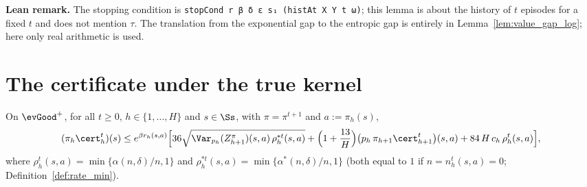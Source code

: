 \textbf{Lean remark.} The stopping condition is \texttt{stopCond r β δ ε s₁ (histAt X Y t ω)};
this lemma is about the history of $t$ episodes for a fixed $t$ and does not mention $\tau$. The
translation from the exponential gap to the entropic gap is entirely in
Lemma~\ref{lem:value_gap_log}; here only real arithmetic is used.

\section{The certificate under the true kernel}
\label{sec:pos_true_kernel}

\begin{lemma}\label{lem:cert_true_recursion_pos}
\leanok
{}
On $\evGood^+$, for all $t \ge 0$, $h \in \{1, \dots, H\}$ and $s \in \Ss$, with $\pi = \pi^{t+1}$ and
$a := \pi_h(s)$,
\[
  (\pi_h\cert_h^t)(s) \le e^{\beta r_h(s,a)}\Big[
    36\sqrt{\Var_{p_h}(Z^\pi_{h+1})(s,a)\,\rho^{*t}_h(s,a)}
    + \Big(1 + \frac{13}{H}\Big)\big(p_h\,\pi_{h+1}\cert^t_{h+1}\big)(s,a)
    + 84\,H\,c_h\,\rho^t_h(s,a)\Big] ,
\]
where $\rho^t_h(s,a) = \min\{\alpha(n,\delta)/n, 1\}$ and $\rho^{*t}_h(s,a) = \min\{\alpha^*(n,\delta)/n, 1\}$
(both equal to $1$ if $n = n_h^t(s,a) = 0$; Definition~\ref{def:rate_min}).
\end{lemma}

